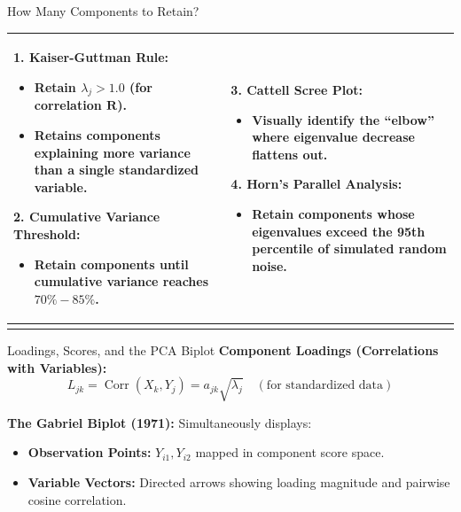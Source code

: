 \documentclass[aspectratio=169,ignorenonframetext]{beamer}
\begin{document}
\begin{frame}{How Many Components to Retain?}
{\def\LTcaptype{none} %
\begin{longtable}[]{@{}
  >{\raggedright\arraybackslash}p{}
  >{\raggedright\arraybackslash}p{}@{}}
\toprule\noalign{}
\endhead
\begin{minipage}[t]{\linewidth}\raggedright
\textbf{1. Kaiser-Guttman Rule:}

\begin{itemize}
\item
  Retain \(\lambda_{j} > 1.0\) (for correlation \(\mathbf{R}\)).
\item
  Retains components explaining more variance than a single standardized
  variable.
\end{itemize}

\textbf{2. Cumulative Variance Threshold:}

\begin{itemize}
\item
  Retain components until cumulative variance reaches \(70\% - 85\%\).
\end{itemize}
\end{minipage} & \begin{minipage}[t]{\linewidth}\raggedright
\textbf{3. Cattell Scree Plot:}

\begin{itemize}
\item
  Visually identify the ``elbow'' where eigenvalue decrease flattens
  out.
\end{itemize}

\textbf{4. Horn's Parallel Analysis:}

\begin{itemize}
\item
  Retain components whose eigenvalues exceed the 95th percentile of
  simulated random noise.
\end{itemize}
\end{minipage} \\
\bottomrule\noalign{}
\end{longtable}
}
\end{frame}

\begin{frame}{Loadings, Scores, and the PCA Biplot}
\textbf{Component Loadings (Correlations with Variables):}
\[L_{jk} = \operatorname{Corr}(X_{k},Y_{j}) = a_{jk}\sqrt{\lambda_{j}}\quad\left( \text{for standardized data} \right)\]

\textbf{The Gabriel Biplot (1971):} Simultaneously displays:

\begin{itemize}
\item
  \textbf{Observation Points:} \(Y_{i1},Y_{i2}\) mapped in component
  score space.
\item
  \textbf{Variable Vectors:} Directed arrows showing loading magnitude
  and pairwise cosine correlation.
\end{itemize}
\end{frame}
\end{document}
